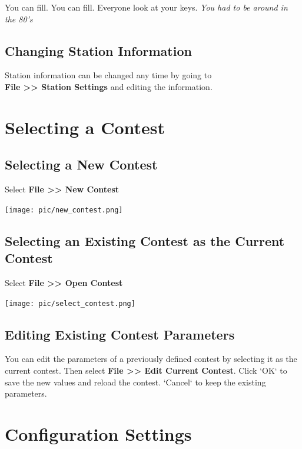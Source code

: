 \documentclass{article}
\begin{document}
You can fill. You can fill. Everyone look at your keys. \emph{You had to be around in the 80's}

\subsection{Changing Station Information}

Station information can be changed any time by going to\\
\textbf{File >> Station Settings} and editing the information.

\section{Selecting a Contest}

\subsection{Selecting a New Contest}

Select \textbf{File >> New Contest}

\vspace{0.5cm}
\texttt{[image: pic/new\_contest.png]}
\vspace{0.5cm}

\subsection{Selecting an Existing Contest as the Current Contest}

Select \textbf{File >> Open Contest}

\vspace{0.5cm}
\texttt{[image: pic/select\_contest.png]}
\vspace{0.5cm}

\subsection{Editing Existing Contest Parameters}

You can edit the parameters of a previously defined contest by selecting it as the current contest. Then select \textbf{File >> Edit Current Contest}. Click `OK` to save the new values and reload the contest. `Cancel` to keep the existing parameters.

\section{Configuration Settings}
\end{document}
